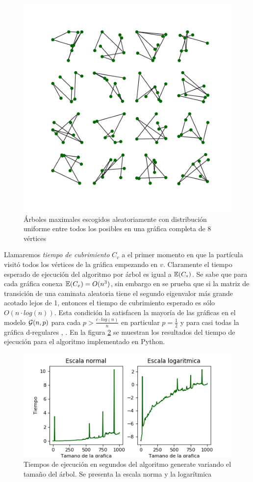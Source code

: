 \begin{figure}[h!]
	\centering
	\includegraphics[scale=0.8]{Python/Figures/Arboles8.png}
	\caption{Árboles maximales escogidos aleatoriamente con distribución uniforme entre todos los posibles en una gráfica completa de $8$ vértices}
	\label{fig:Arboles8}
\end{figure}

Llamaremos \textit{tiempo de cubrimiento} $C_{v}$ a el primer momento en que la partícula visitó todos los vértices de la gráfica empezando en $v$. Claramente el tiempo esperado de ejecución del algoritmo por árbol es igual a $\mathbb{E}(C_{s})$. Se sabe que para cada gráfica conexa $\mathbb{E}(C_{v}) = O(n^{3})$, sin embargo en \cite{BS89} se prueba que si la matriz de transición de una caminata aleatoria tiene el segundo eigenvalor más grande acotado lejos de 1, entonces el tiempo de cubrimiento esperado es sólo $O(n\cdot log(n))$. Esta condición la satisfacen la mayoría de las gráficas en el modelo $\mathcal{G}(n,p)$ para cada $p > \frac{c\cdot log(n)}{n}$ en particular $p=\frac{1}{2}$ y para casi todas la gráfica d-regulares \cite{BS87}, \cite{FKS89}. En la figura \ref{fig:tiemposGEN} se muestran los resultados del tiempo de ejecución para el algoritmo implementado en Python.

\begin{figure}[h!]
	\centering
	\includegraphics[scale=0.8]{Python/Figures/Time-generate.png}
	\caption{Tiempos de ejecución en segundos del algoritmo generate variando el tamaño del árbol. Se presenta la escala norma y la logarítmica}
	\label{fig:tiemposGEN}
\end{figure}
